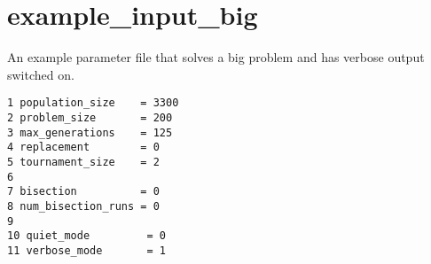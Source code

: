 \hypertarget{example__input__big-example}{
\section{example\_\-input\_\-big}
}
An example parameter file that solves a big problem and has verbose output switched on.



\begin{DocInclude}\begin{verbatim}1 population_size    = 3300
2 problem_size       = 200
3 max_generations    = 125
4 replacement        = 0
5 tournament_size    = 2
6 
7 bisection          = 0
8 num_bisection_runs = 0
9 
10 quiet_mode         = 0
11 verbose_mode       = 1
\end{verbatim}
\end{DocInclude}
 